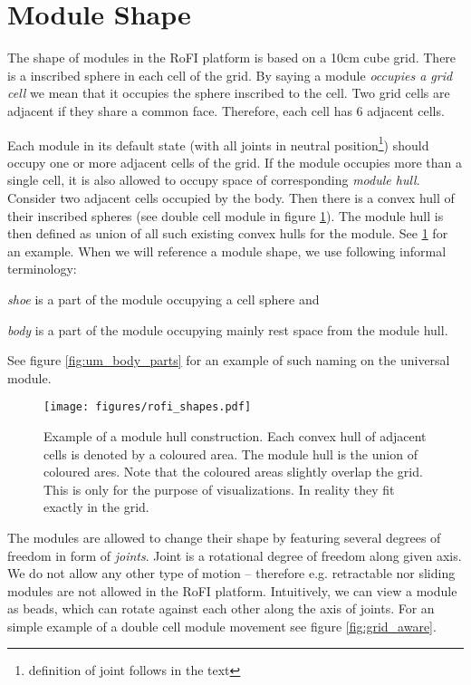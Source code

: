 \section{Module Shape}\label{sec:aware}

The shape of modules in the RoFI platform is based on a 10cm cube grid. There is
a inscribed sphere in each cell of the grid. By saying a module \emph{occupies a
grid cell} we mean that it occupies the sphere inscribed to the cell. Two grid
cells are adjacent if they share a common face. Therefore, each cell has 6
adjacent cells.

Each module in its default state (with all joints in neutral
position\footnote{definition of joint follows in the text}) should occupy one or
more adjacent cells of the grid. If the module occupies more than a single cell,
it is also allowed to occupy space of corresponding \emph{module hull}. Consider
two adjacent cells occupied by the body. Then there is a convex hull of their
inscribed spheres (see double cell module in figure \ref{fig:rofi_shapes}). The
module hull is then defined as union of all such existing convex hulls for the
module. See \ref{fig:rofi_shapes} for an example. When we will reference a
module shape, we use following informal terminology:
\begin{itemize*}
    \item \emph{shoe} is a part of the module occupying a cell sphere and
    \item \emph{body} is a part of the module occupying mainly rest space from
    the module hull.
\end{itemize*}
See figure \ref{fig:um_body_parts} for an example of such naming on the
universal module.

\begin{figure}[h!]
    \centering
    \texttt{[image: figures/rofi\_shapes.pdf]}
    \caption{Example of a module hull construction. Each convex hull of adjacent
    cells is denoted by a coloured area. The module hull is the union of coloured
    ares. Note that the coloured areas slightly overlap the grid. This is only
    for the purpose of visualizations. In reality they fit exactly in the grid.}
    \label{fig:rofi_shapes}
\end{figure}

The modules are allowed to change their shape by featuring several degrees of
freedom in form of \emph{joints}. Joint is a rotational degree of freedom along
given axis. We do not allow any other type of motion -- therefore e.g.
retractable nor sliding modules are not allowed in the RoFI platform.
Intuitively, we can view a module as beads, which can rotate against each other
along the axis of joints. For an simple example of a double cell module movement
see figure \ref{fig:grid_aware}.

